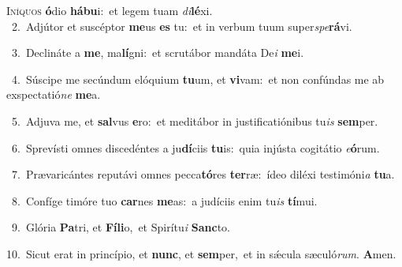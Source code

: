 \lettrine{\initial\textcolor{\initialcolor}{I}}{níquos} \textbf{ó}\-dio \textbf{há}\-\textbf{bu}i:~\star et legem tuam \textit{di}\-\textbf{lé}xi.\\
{\numbfont\textcolor{\numbcolor}{~2.}}~Adjútor et suscéptor \textbf{me}\-us \textbf{es} tu:~\star et in verbum tuum super\-\textit{spe}\-\textbf{rá}vi.\par
{\numbfont\textcolor{\numbcolor}{~3.}}~Declináte a \textbf{me}\-, ma\-\textbf{lí}\-gni:~\star et scrutábor mandáta De\textit{i} \textbf{me}\-i.\par
{\numbfont\textcolor{\numbcolor}{~4.}}~Súscipe me secúndum elóquium \textbf{tu}\-um, et \textbf{vi}\-vam:~\star et non confúndas me ab exspectatió\textit{ne} \textbf{me}\-a.\par
{\numbfont\textcolor{\numbcolor}{~5.}}~Adjuva me, et \textbf{sal}\-vus \textbf{e}\-ro:~\star et meditábor in justificatiónibus tu\textit{is} \textbf{sem}\-per.\par
{\numbfont\textcolor{\numbcolor}{~6.}}~Sprevísti omnes discedéntes a ju\-\textbf{dí}\-ciis \textbf{tu}\-is:~\star quia injústa cogitátio \textit{e}\-\textbf{ó}rum.\par
{\numbfont\textcolor{\numbcolor}{~7.}}~Prævaricántes reputávi omnes pecca\-\textbf{tó}\-res \textbf{ter}\-ræ:~\star ídeo diléxi testimóni\textit{a} \textbf{tu}\-a.\par
{\numbfont\textcolor{\numbcolor}{~8.}}~Confíge timóre tuo \textbf{car}\-nes \textbf{me}\-as:~\star a judíciis enim tu\textit{is} \textbf{tí}\-mui.\par
{\numbfont\textcolor{\numbcolor}{~9.}}~Glória \textbf{Pa}\-tri, et \textbf{Fí}\-\textbf{li}o,~\star et Spirítu\textit{i} \textbf{Sanc}\-to.\par
{\numbfont\textcolor{\numbcolor}{10.}}~Sicut erat in princípio, et \textbf{nunc}\-, et \textbf{sem}\-per,~\star et in sǽcula sæculó\-\textit{rum}\-. \textbf{A}\-men.\par
